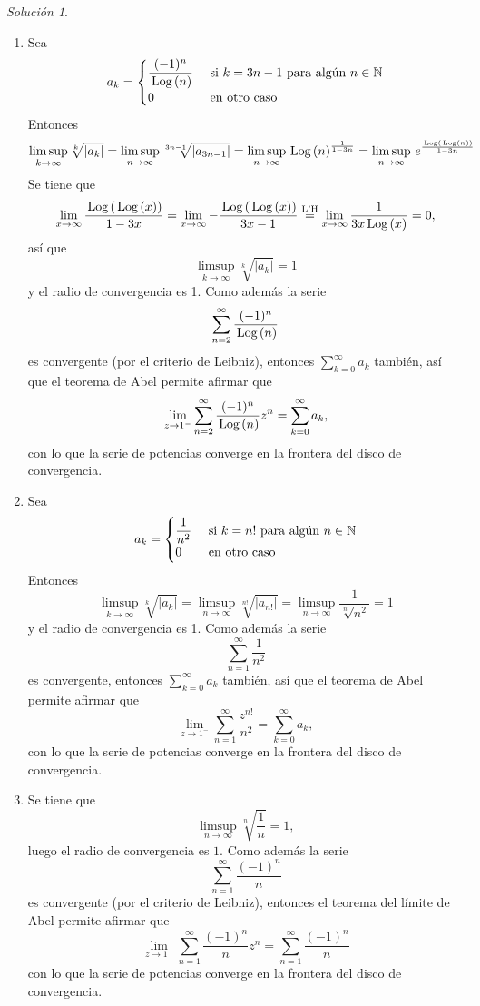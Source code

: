 \documentclass[11pt]{report}
\newcommand{\N}{\mathbb N}
\newcommand{\pars}[1]{\left( #1 \right)} %
\newcommand{\Log}[1]{\,\textup{Log}\pars{#1}}
\newcommand{\serie}[2][0]{\sum_{n=#1}^\infty #2}
\theoremstyle{remark}
\newtheorem*{resolution}{Solución}
\begin{document}
\pagebreak

\begin{resolution}
\hfill
\begin{enumerate}
    \item Sea
    \[a_k =\begin{cases}
        \displaystyle\frac{(-1)^n}{\Log{n}} & $ si $ k =3n-1 $ para algún $ n \in \N \\
        0 & $ en otro caso$
    \end{cases}\]
    Entonces
    \[\limsup_{k \to \infty} \sqrt[k]{|a_k|} = \limsup_{n \to \infty}\sqrt[3n-1]{|a_{3n-1}|} = \limsup_{n \to \infty} \Log{n}^{\frac{1}{1-3n}} = \limsup_{n \to \infty} \, e^{\frac{\Log{\Log{n}}}{1-3n}}\]
    Se tiene que
    \[\lim_{x \to \infty} \frac{\Log{\Log{x}}}{1-3x} =\lim_{x \to \infty} -\frac{\Log{\Log{x}}}{3x-1} \overset{\textup{L'H}}{=} \lim_{x \to \infty}\frac{1}{3x\Log{x}} = 0,\]
    así que
    \[\limsup_{k \to \infty} \sqrt[k]{|a_k|} = 1\]
    y el radio de convergencia es 1. Como además la serie
    \[\serie[2]{\frac{(-1)^n}{\Log{n}}}\]
    es convergente (por el criterio de Leibniz), entonces $\sum_{k=0}^\infty a_k$ también, así que el teorema de Abel permite afirmar que
    \[\lim_{z \to 1^-} \serie[2]\frac{(-1)^n}{\Log{n}}z^n = \sum_{k=0}^\infty a_k,\]
    con lo que la serie de potencias converge en la frontera del disco de convergencia.
        \item Sea
    \[a_k =\begin{cases}
        \displaystyle \frac{1}{n^2} & $ si $ k =n! $ para algún $ n \in \N \\
        0 & $ en otro caso$
    \end{cases}\]
    Entonces
    \[\limsup_{k \to \infty} \sqrt[k]{|a_k|} = \limsup_{n \to \infty}\sqrt[n!]{|a_{n!}|} = \limsup_{n \to \infty}\frac{1}{\sqrt[n!]{n^2}} = 1\]
    y el radio de convergencia es 1. Como además la serie
    \[\serie[1]{\frac{1}{n^2}}\]
    es convergente, entonces $\sum_{k=0}^\infty a_k$ también, así que el teorema de Abel permite afirmar que
    \[\lim_{z \to 1^-} \serie[1]\frac{z^{n!}}{n^2} = \sum_{k=0}^\infty a_k,\]
    con lo que la serie de potencias converge en la frontera del disco de convergencia.
    \item Se tiene que
    \[\limsup_{n \to \infty} \sqrt[n]{\frac{1}{n}} = 1,\]
    luego el radio de convergencia es $1$. Como además la serie \[\serie[1]{\frac{(-1)^n}{n}}\] es convergente (por el criterio de Leibniz), entonces el teorema del límite de Abel permite afirmar que
    \[\lim_{z \to 1^-} \serie[1]{\frac{(-1)^n}{n}z^n} =\serie[1]{\frac{(-1)^n}{n}}\]
    con lo que la serie de potencias converge en la frontera del disco de convergencia.
\end{enumerate}
\end{resolution}
\end{document}

